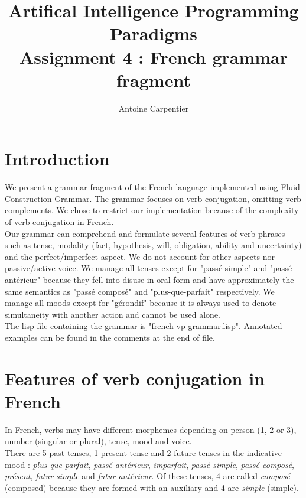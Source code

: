 \documentclass[a4paper,10pt]{article}
\title{Artifical Intelligence Programming Paradigms\\Assignment 4 : French grammar fragment}
\author{Antoine Carpentier}
\begin{document}
\maketitle

\section{Introduction}

We present a grammar fragment of the French language implemented using Fluid Construction Grammar. The grammar focuses on verb conjugation, omitting verb complements. We chose to restrict our implementation because of the complexity of verb conjugation in French. \\

Our grammar can comprehend and formulate several features of verb phrases such as tense, modality (fact, hypothesis, will, obligation, ability and uncertainty) and the perfect/imperfect aspect. We do not account for other aspects nor passive/active voice. We manage all tenses except for "passé simple" and "passé antérieur" because they fell into disuse in oral form and have approximately the same semantics as "passé composé" and "plus-que-parfait" respectively. We manage all moods except for "gérondif" because it is always used to denote simultaneity with another action and cannot be used alone. \\

The lisp file containing the grammar is "french-vp-grammar.lisp". Annotated examples can be found in the comments at the end of file.

\section{Features of verb conjugation in French}

In French, verbs may have different morphemes depending on person (1, 2 or 3), number (singular or plural), tense, mood and voice. \\

There are 5 past tenses, 1 present tense and 2 future tenses in the indicative mood : \textit{plus-que-parfait}, \textit{passé antérieur}, \textit{imparfait}, \textit{passé simple}, \textit{passé composé}, \textit{présent}, \textit{futur simple} and \textit{futur antérieur}. Of these tenses, 4 are called \textit{composé} (composed) because they are formed with an auxiliary and 4 are \textit{simple} (simple). \\
\end{document}

